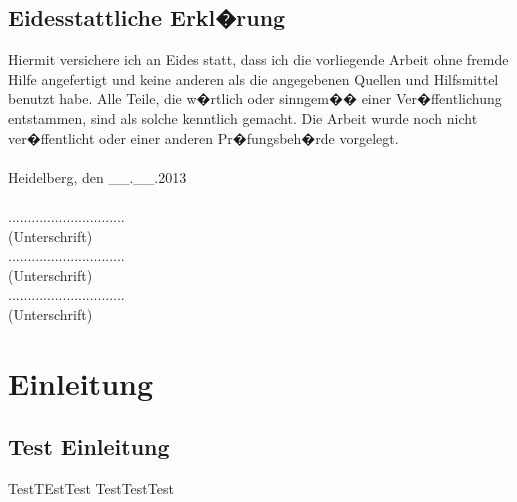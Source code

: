 \documentclass[german]{report}
\begin{document}
\section*{Eidesstattliche Erkl�rung}\thispagestyle{empty}
Hiermit versichere ich an Eides statt, dass ich die vorliegende Arbeit ohne fremde Hilfe angefertigt und keine anderen als die angegebenen Quellen und Hilfsmittel benutzt habe. Alle Teile, die w�rtlich oder sinngem�� einer Ver�ffentlichung entstammen, sind als solche kenntlich gemacht. Die Arbeit wurde noch nicht ver�ffentlicht oder einer anderen Pr�fungsbeh�rde vorgelegt.\\
\\
Heidelberg, den \_\_.\_\_.2013 \\
\\
.............................. \\
(Unterschrift)
\\
.............................. \\
(Unterschrift)
\\
.............................. \\
(Unterschrift)
\newpage

\setcounter{page}{1}



\tableofcontents

\listoffigures

\lstlistoflistings




\newpage

\chapter{Einleitung}
\label{sec:chapter1}
\section{Test Einleitung}
TestTEstTest
\newpage
TestTestTest\cite{TEST}

\end{document}
